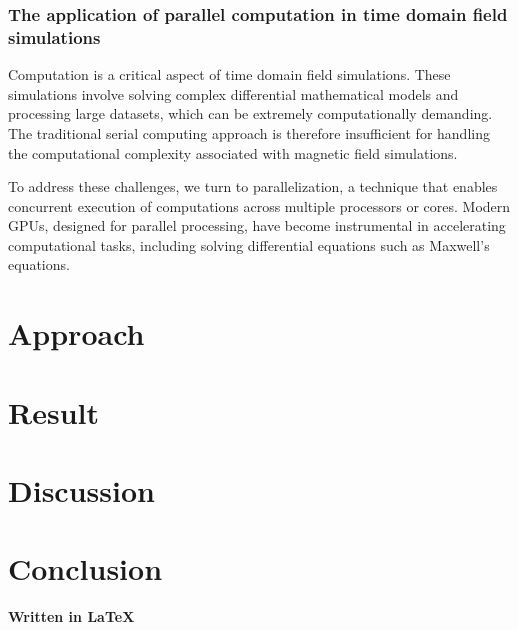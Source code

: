 \documentclass[11pt, a4paper, titlepage]{article}
\begin{document}
\subsubsection{The application of parallel computation in time domain field simulations}
Computation is a critical aspect of time domain field simulations. These simulations involve solving complex differential mathematical models and processing large datasets, which can be extremely computationally demanding. The traditional serial computing approach is therefore insufficient for handling the computational complexity associated with magnetic field simulations.

To address these challenges, we turn to parallelization, a technique that enables concurrent execution of computations across multiple processors or cores. Modern GPUs, designed for parallel processing, have become instrumental in accelerating computational tasks, including solving differential equations such as Maxwell's equations.




\newpage
\section{Approach}



\newpage
\section{Result}
\newpage
\section{Discussion}
\newpage
\section{Conclusion}
\newpage

\newpage
\newpage
{} 
\printbibliography




\begin{center}
	\large\textbf{Written in \LaTeX}
\end{center}
\end{document}
